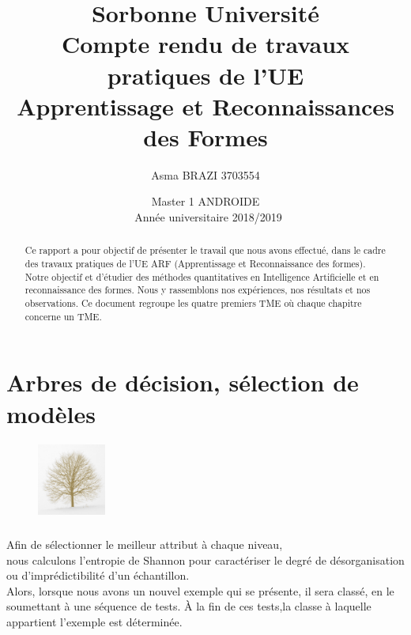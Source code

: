 \documentclass{report}
\title{Sorbonne Université\\Compte rendu de travaux pratiques de l'UE \\Apprentissage et Reconnaissances des Formes} %
\author{Asma \textsc{BRAZI} 3703554\\} %
\date{Master 1 ANDROIDE\\ Année universitaire 2018/2019}
\begin{document}
\maketitle

\tableofcontents
\begin{abstract}
Ce rapport a pour objectif de présenter le travail que nous avons effectué, dans le cadre des travaux pratiques de l'UE ARF (Apprentissage et Reconnaissance des formes). Notre objectif et d'étudier des méthodes quantitatives en Intelligence Artificielle et en reconnaissance des formes. Nous y rassemblons nos expériences, nos résultats et nos observations. Ce document regroupe les quatre premiers TME où chaque chapitre concerne un TME. 
\end{abstract}

\chapter{Arbres de décision, sélection de modèles}




\begin{figure}
  \vspace{-20pt}
  \begin{center}
    \includegraphics[width=0.2\textwidth]{tree.png}
  \end{center}
  \vspace{-20pt}
  \vspace{-10pt}
\end{figure}

\paragraph{}
Afin de sélectionner le meilleur attribut à chaque niveau,\\ nous calculons l'entropie de Shannon pour caractériser le degré de désorganisation ou d'imprédictibilité d’un échantillon. \\
Alors, lorsque nous avons un nouvel exemple qui se présente, il sera classé, en le soumettant à une séquence de tests. À la fin de ces tests,la classe à laquelle appartient l'exemple est déterminée. 
\\
\\
\end{document}
